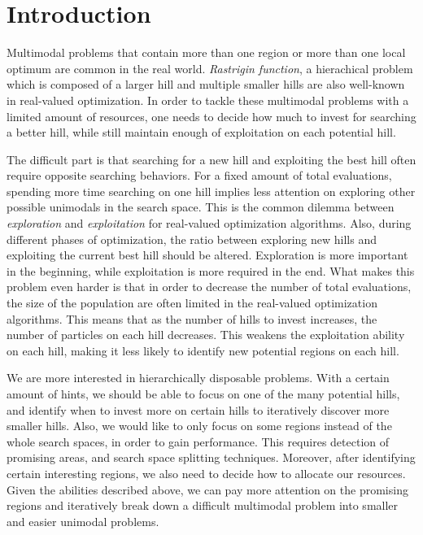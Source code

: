 \chapter{Introduction}
\label{c:intro}

Multimodal problems that contain more than one region or more than one local optimum are common in the real world.
{\em Rastrigin function}, a hierachical problem which is composed of a larger hill and multiple smaller hills are also well-known in real-valued optimization.
In order to tackle these multimodal problems with a limited amount of resources, 
one needs to decide how much to invest for searching a better hill, 
while still maintain enough of exploitation on each potential hill.

The difficult part is that searching for a new hill and exploiting the best hill often require opposite searching behaviors.
For a fixed amount of total evaluations, spending more time searching on one hill implies 
less attention on exploring other possible unimodals in the search space.
This is the common dilemma between {\em exploration} and {\em exploitation} for real-valued optimization algorithms.
Also, during different phases of optimization, 
the ratio between exploring new hills and exploiting the current best hill should be altered.
Exploration is more important in the beginning, while exploitation is more required in the end.
What makes this problem even harder is that in order to decrease the number of total evaluations, 
the size of the population are often limited in the real-valued optimization algorithms.
This means that as the number of hills to invest increases, the number of particles on each hill decreases.
This weakens the exploitation ability on each hill, making it less likely to identify new potential regions on each hill.

We are more interested in hierarchically disposable problems.
With a certain amount of hints, we should be able to focus on one of the many potential hills, 
and identify when to invest more on certain hills to iteratively discover more smaller hills.
Also, we would like to only focus on some regions instead of the whole search spaces, in order to gain performance.
This requires detection of promising areas, and search space splitting techniques.
Moreover, after identifying certain interesting regions, we also need to decide how to allocate our resources.
Given the abilities described above, 
we can pay more attention on the promising regions and 
iteratively break down a difficult multimodal problem into smaller and easier unimodal problems.

